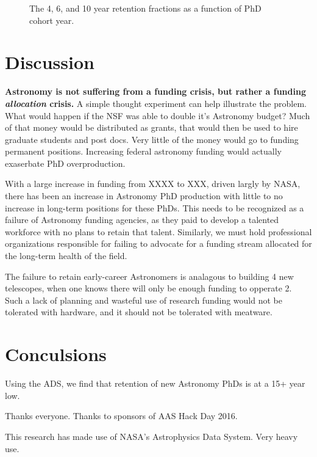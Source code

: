 \documentclass{emulateapj}
\begin{document}
\begin{figure}
  \caption{ \label{fig:active_curves}}
  \end{figure}


\begin{figure}
  \caption{The 4, 6, and 10 year retention fractions as a function of PhD cohort year.\label{fig:retention}}
\end{figure}


\section{Discussion}

{\bf{Astronomy is not suffering from a funding crisis, but rather a funding {\emph{allocation}} crisis.}} A simple thought experiment can help illustrate the problem. What would happen if the NSF was able to double it's Astronomy budget? Much of that money would be distributed as grants, that would then be used to hire graduate students and post docs. Very little of the money would go to funding permanent positions. Increasing federal astronomy funding would actually exaserbate PhD overproduction. 

With a large increase in funding from XXXX to XXX, driven largly by NASA, there has been an increase in Astronomy PhD production with little to no increase in long-term positions for these PhDs.  This needs to be recognized as a failure of Astronomy funding agencies, as they paid to develop a talented workforce with no plans to retain that talent. Similarly, we must hold professional organizations responsible for failing to advocate for a funding stream allocated for the long-term health of the field.  

The failure to retain early-career Astronomers is analagous to building 4 new telescopes, when one knows there will only be enough funding to opperate 2.  Such a lack of planning and wasteful use of research funding would not be tolerated with hardware, and it should not be tolerated with meatware. 





\section{Conculsions}
Using the ADS, we find that retention of new Astronomy PhDs is at a 15+ year low.  


\acknowledgments
Thanks everyone. Thanks to sponsors of AAS Hack Day 2016.

This research has made use of NASA's Astrophysics Data System. Very heavy use.


\end{document}
